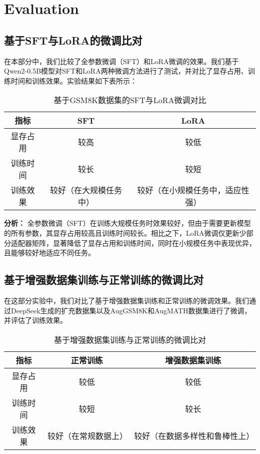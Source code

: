 \documentclass{article}
\begin{document}
\section{Evaluation}

\subsection{基于SFT与LoRA的微调比对}
在本部分中，我们比较了全参数微调（SFT）和LoRA微调的效果。我们基于Qwen2-0.5B模型对SFT和LoRA两种微调方法进行了测试，并对比了显存占用、训练时间和训练效果。实验结果如下表所示：

\begin{table}[ht]
    \caption{基于GSM8K数据集的SFT与LoRA微调对比}
    \label{comparison-table}
    \centering
    \begin{tabular}{|c|c|c|}
      \hline
      \textbf{指标} & \textbf{SFT} & \textbf{LoRA} \\ \hline
      显存占用 & 较高 & 较低 \\ \hline
      训练时间 & 较长 & 较短 \\ \hline
      训练效果 & 较好（在大规模任务中） & 较好（在小规模任务中，适应性强） \\ \hline
    \end{tabular}
\end{table}

\textbf{分析：}
全参数微调（SFT）在训练大规模任务时效果较好，但由于需要更新模型的所有参数，其显存占用较高且训练时间较长。相比之下，LoRA微调仅更新少部分适配器矩阵，显著降低了显存占用和训练时间，同时在小规模任务中表现优异，且能够较好地适应不同任务。

\subsection{基于增强数据集训练与正常训练的微调比对}
在这部分实验中，我们对比了基于增强数据集训练和正常训练的微调效果。我们通过DeepSeek生成的扩充数据集以及AugGSM8K和AugMATH数据集进行了微调，并评估了训练效果。

\begin{table}[H]
  \caption{基于增强数据集训练与正常训练的微调比对}
  \label{augmentation-comparison-table}
  \centering
  \begin{tabular}{|c|c|c|}
    \hline
    \textbf{指标} & \textbf{正常训练} & \textbf{增强数据集训练} \\ \hline
    显存占用 & 较低 & 较低 \\ \hline
    训练时间 & 较短 & 较长 \\ \hline
    训练效果 & 较好（在常规数据上） & 较好（在数据多样性和鲁棒性上） \\ \hline
  \end{tabular}
\end{table}
\end{document}
